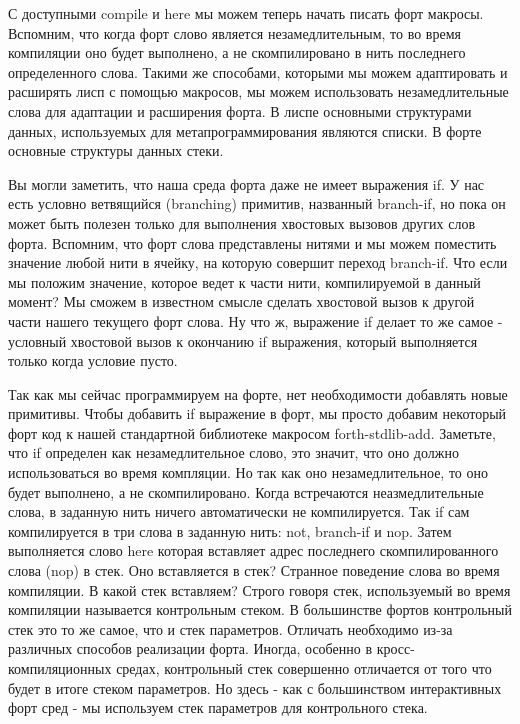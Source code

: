 {{{С доступными compile и here мы можем теперь начать писать форт макросы. Вспомним, что когда форт слово является незамедлительным, то во время компиляции оно будет выполнено, а не скомпилировано в нить последнего определенного слова. Такими же способами, которыми мы можем адаптировать и расширять лисп с помощью макросов, мы можем использовать незамедлительные слова для адаптации и расширения форта. В лиспе основными структурами данных, используемых для метапрограммирования являются списки. В форте основные структуры данных стеки.

Вы могли заметить, что наша среда форта даже не имеет выражения if. У нас есть условно ветвящийся (branching) примитив, названный branch-if, но пока он может быть полезен только для выполнения хвостовых вызовов других слов форта. Вспомним, что форт слова представлены нитями и мы можем поместить значение любой нити в ячейку, на которую совершит переход branch-if. Что если мы положим значение, которое ведет к части нити, компилируемой в данный момент? Мы сможем в известном смысле сделать хвостовой вызов к другой части нашего текущего форт слова. Ну что ж, выражение if делает то же самое - условный хвостовой вызов к окончанию if выражения, который выполняется только когда условие пусто.

Так как мы сейчас программируем на форте, нет необходимости добавлять новые примитивы. Чтобы добавить if выражение в форт, мы просто добавим некоторый форт код к нашей стандартной библиотеке макросом forth-stdlib-add. Заметьте, что if определен как незамедлительное слово, это значит, что оно должно использоваться во время компляции. Но так как оно незамедлительное, то оно будет выполнено, а не скомпилировано. Когда встречаются неазмедлительные слова, в заданную нить ничего автоматически не компилируется. Так if сам компилируется в три слова в заданную нить: not, branch-if и nop. Затем выполняется слово here которая вставляет адрес последнего скомпилированного слова (nop) в стек. Оно вставляется в стек? Странное поведение слова во время компиляции. В какой стек вставляем? Строго говоря стек, используемый во время компиляции называется контрольным стеком. В большинстве фортов контрольный стек это то же самое, что и стек параметров. Отличать необходимо из-за различных способов реализации форта. Иногда, особенно в кросс-компиляционных средах, контрольный стек совершенно отличается от того что будет в итоге стеком параметров. Но здесь - как с большинством интерактивных форт сред - мы используем стек параметров для контрольного стека.

}}}
